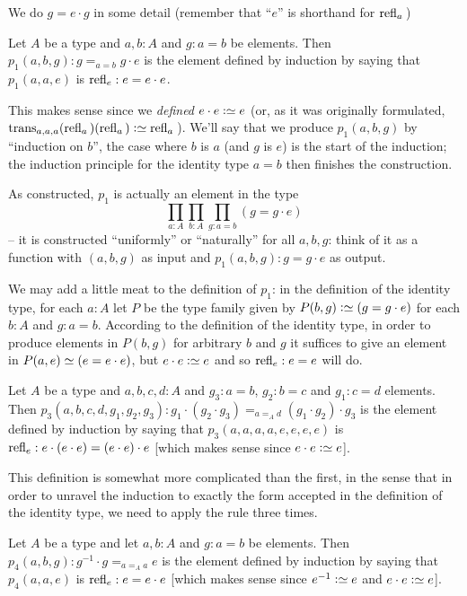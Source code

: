We do $g=e\cdot g$ in some detail (remember that ``$e$'' is shorthand for $\refl a{}$)
\begin{definition}\label{def:p1}
  Let $A$ be a type and $a, b:A$ and $g:a=b$ be elements.  Then $p_1(a,b,g):g=_{a=b}g\cdot e$ is the element defined by induction by saying that $p_1(a,a,e)$ is $\refl e:e=e\cdot e$.
\end{definition}
\begin{remark}
  This makes sense since we \emph{defined} $e\cdot e\defequi e$ (or, as it was originally formulated, $\trans_{a,a,a}(\refl a{})(\refl a{})\defequi \refl a{}$).  We'll say that we produce $p_1(a,b,g)$ by ``induction on $b$'', the case where $b$ is $a$ (and $g$ is $e$) is the start of the induction; the induction principle for the identity type $a=b$ then finishes the construction.

As constructed, $p_1$ is actually an element in the type
$$\prod_{a:A}\prod_{b:A}\prod_{g:a=b}(g=g\cdot e)$$ -- it is constructed ``uniformly'' or ``naturally'' for all $a,b,g$: think of it as a function with $(a,b,g)$ as input and $p_1(a,b,g):g=g\cdot e$ as output.

We may add a little meat to the definition of $p_1$: in the definition of the identity type, for each $a:A$ let $P$ be the type family given by $P(b,g)\defequi (g=g\cdot e)$ for each $b:A$ and $g:a=b$.  
According to the definition of the identity type, in order to produce elements in $P(b,g)$ for arbitrary $b$ and $g$ it suffices to give an element in $P(a,e)\oldequiv (e=e\cdot e)$, but $e\cdot e\defequi e$ and so $\refl e:e=e$ will do.
\end{remark}
\begin{definition}\label{def:p3}
  Let $A$ be a type and $a,b,c,d:A$ and $g_3:a=b$, $g_2:b=c$ and $g_1:c=d$ elements.  Then $p_3(a,b,c,d,g_1,g_2,g_3):g_1\cdot(g_2\cdot g_3)=_{a=_Ad}(g_1\cdot g_2)\cdot g_3$ is the element defined by induction by saying that $p_3(a,a,a,a,e,e,e,e)$ is $\refl e:e\cdot(e\cdot e)=(e\cdot e)\cdot e$ [which makes sense since $e\cdot e\defequi e$].
\end{definition}
\begin{remark}
  This definition is somewhat more complicated than the first, in the sense that in order to unravel the induction to exactly the form accepted in the definition of the identity type, we need to apply the rule three times.  %
\end{remark}
\begin{definition}\label{def:p4}
  Let $A$ be a type and let $a,b:A$ and $g:a=b$ be elements.  Then $p_4(a,b,g):g^{-1}\cdot g=_{a=_Aa} e$ is the element defined by induction by saying that $p_4(a,a,e)$ is $\refl e:e=e\cdot e$ [which makes sense since $e^{-1}\defequi e$ and $e\cdot e\defequi e$].
\end{definition}

